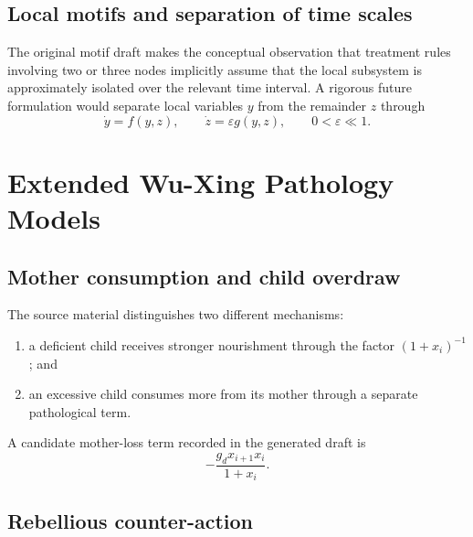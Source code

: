 \documentclass[11pt, reqno]{amsart}
\theoremstyle{definition}
\theoremstyle{remark}
\newcommand{\eps}{\varepsilon}
\begin{document}

\subsection{Local motifs and separation of time scales}

The original motif draft makes the conceptual observation that treatment rules
involving two or three nodes implicitly assume that the local subsystem is
approximately isolated over the relevant time interval.  A rigorous future
formulation would separate local variables $y$ from the remainder $z$ through
\begin{equation}
\label{eq:slow-fast-motif}
    \dot y=f(y,z),
    \qquad
    \dot z=\eps g(y,z),
    \qquad
    0<\eps\ll1.
\end{equation}


\section{Extended Wu-Xing Pathology Models}
\label{app:pathologies}

\subsection{Mother consumption and child overdraw}

The source material distinguishes two different mechanisms:
\begin{enumerate}[label=(\roman*),leftmargin=2.5em]
    \item a deficient child receives stronger nourishment through the factor
    $(1+x_i)^{-1}$; and
    \item an excessive child consumes more from its mother through a separate
    pathological term.
\end{enumerate}
A candidate mother-loss term recorded in the generated draft is
\begin{equation}
\label{eq:overdraw-term}
    -\frac{g_d x_{i+1}x_i}{1+x_i}.
\end{equation}

\subsection{Rebellious counter-action}
\end{document}
